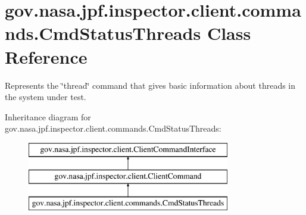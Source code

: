 \hypertarget{classgov_1_1nasa_1_1jpf_1_1inspector_1_1client_1_1commands_1_1_cmd_status_threads}{}\section{gov.\+nasa.\+jpf.\+inspector.\+client.\+commands.\+Cmd\+Status\+Threads Class Reference}
\label{classgov_1_1nasa_1_1jpf_1_1inspector_1_1client_1_1commands_1_1_cmd_status_threads}


Represents the \char`\"{}thread\char`\"{} command that gives basic information about threads in the system under test.  


Inheritance diagram for gov.\+nasa.\+jpf.\+inspector.\+client.\+commands.\+Cmd\+Status\+Threads\+:\begin{figure}[H]
\begin{center}
\leavevmode
\includegraphics[height=3.000000cm]{classgov_1_1nasa_1_1jpf_1_1inspector_1_1client_1_1commands_1_1_cmd_status_threads}
\end{center}
\end{figure}
